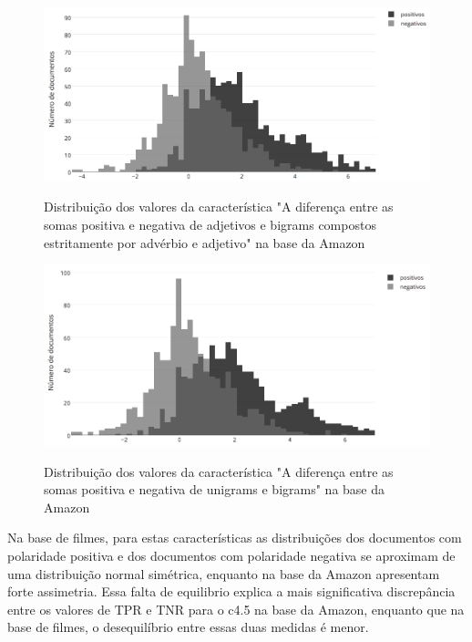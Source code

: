 \documentclass[template.tex]{subfiles}
\begin{document}
\begin{figure}[phtb]
\caption{Distribuição dos valores da característica "A diferença entre as somas positiva e negativa de adjetivos e bigrams compostos estritamente por advérbio e adjetivo" na base da Amazon}
\centering
\includegraphics[scale=0.5]{amazon_positive_to_negative_ratio_of_adjectives_sum_and_bigrams_with_adjectives}
\label{figura:amazon_dist_1}
\end{figure}

\begin{figure}[phtb]
\caption{Distribuição dos valores da característica "A diferença entre as somas positiva e negativa de unigrams e bigrams" na base da Amazon}
\centering
\includegraphics[scale=0.5]{amazon_positive_to_negative_ratio_of_unigrams_and_bigrams_sum}
\label{figura:amazon_dist_2}
\end{figure}

Na base de filmes, para estas características as distribuições dos documentos com polaridade positiva e dos documentos com polaridade negativa se aproximam de uma distribuição normal simétrica, enquanto na base da Amazon apresentam forte assimetria. Essa falta de equilibrio explica a mais significativa discrepância entre os valores de TPR  e TNR para o c4.5 na base da Amazon, enquanto que na base de filmes, o desequilíbrio entre essas duas medidas é menor. 
\end{document}
